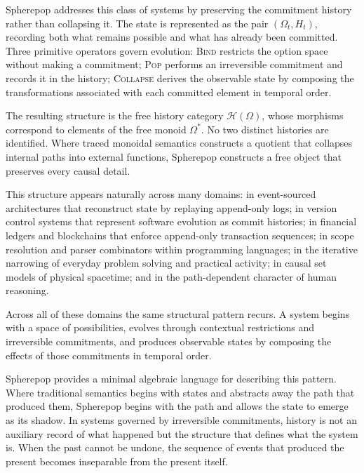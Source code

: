\documentclass[12pt]{article}
\begin{document}
Spherepop addresses this class of systems by preserving the commitment history rather than collapsing it. The state is represented as the pair $(\Omega_t, H_t)$, recording both what remains possible and what has already been committed. Three primitive operators govern evolution: \textsc{Bind} restricts the option space without making a commitment; \textsc{Pop} performs an irreversible commitment and records it in the history; \textsc{Collapse} derives the observable state by composing the transformations associated with each committed element in temporal order.

The resulting structure is the free history category $\mathcal{H}(\Omega)$, whose morphisms correspond to elements of the free monoid $\Omega^*$. No two distinct histories are identified. Where traced monoidal semantics constructs a quotient that collapses internal paths into external functions, Spherepop constructs a free object that preserves every causal detail.

This structure appears naturally across many domains: in event-sourced architectures that reconstruct state by replaying append-only logs; in version control systems that represent software evolution as commit histories; in financial ledgers and blockchains that enforce append-only transaction sequences; in scope resolution and parser combinators within programming languages; in the iterative narrowing of everyday problem solving and practical activity; in causal set models of physical spacetime; and in the path-dependent character of human reasoning.

Across all of these domains the same structural pattern recurs. A system begins with a space of possibilities, evolves through contextual restrictions and irreversible commitments, and produces observable states by composing the effects of those commitments in temporal order.

Spherepop provides a minimal algebraic language for describing this pattern. Where traditional semantics begins with states and abstracts away the path that produced them, Spherepop begins with the path and allows the state to emerge as its shadow. In systems governed by irreversible commitments, history is not an auxiliary record of what happened but the structure that defines what the system is. When the past cannot be undone, the sequence of events that produced the present becomes inseparable from the present itself.
\end{document}
